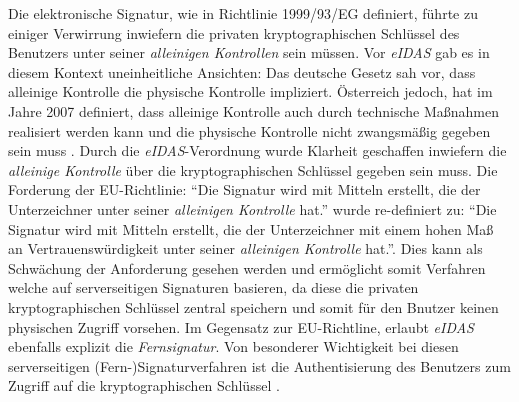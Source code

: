 \documentclass[11pt,a4paper,ngerman]{scrreprt}
\begin{document}
Die elektronische Signatur, wie in Richtlinie 1999/93/EG definiert, führte zu einiger Verwirrung inwiefern die privaten kryptographischen Schlüssel des Benutzers unter seiner \emph{alleinigen Kontrollen} sein müssen. Vor \emph{eIDAS} gab es in diesem Kontext uneinheitliche Ansichten: Das deutsche Gesetz sah vor, dass alleinige Kontrolle die physische Kontrolle impliziert. Österreich jedoch, hat im Jahre 2007 definiert, dass alleinige Kontrolle auch durch technische Maßnahmen realisiert werden kann und die physische Kontrolle nicht zwangsmäßig gegeben sein muss \cite[S.\,220]{scWorkshop}. Durch die \textit{eIDAS}-Verordnung wurde Klarheit geschaffen inwiefern die \emph{alleinige Kontrolle} über die kryptographischen Schlüssel gegeben sein muss. Die Forderung der EU-Richtlinie: ``Die Signatur wird mit Mitteln erstellt, die der Unterzeichner unter seiner \emph{alleinigen Kontrolle} hat.'' wurde re-definiert zu: ``Die Signatur wird mit Mitteln erstellt, die der Unterzeichner mit einem hohen Maß an Vertrauenswürdigkeit unter seiner \emph{alleinigen Kontrolle} hat.''\cite[S.\,221]{scWorkshop}. Dies kann als Schwächung der Anforderung gesehen werden und ermöglicht somit Verfahren welche auf serverseitigen Signaturen basieren, da diese die privaten kryptographischen Schlüssel zentral speichern und somit für den Bnutzer keinen physischen Zugriff vorsehen. Im Gegensatz zur EU-Richtline, erlaubt \textit{eIDAS} ebenfalls explizit die \emph{Fernsignatur}. Von besonderer Wichtigkeit bei diesen serverseitigen (Fern-)Signaturverfahren ist die Authentisierung des Benutzers zum Zugriff auf die kryptographischen Schlüssel \cite[223]{scWorkshop}. 
\end{document}
